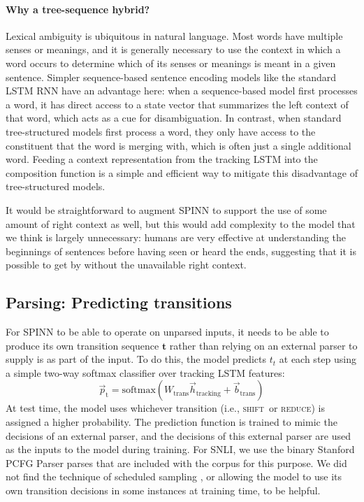 \documentclass[11pt]{article}
\newcommand{\shift}{\textsc{shift}}
\newcommand{\reduce}{\textsc{reduce}}
\begin{document}
\paragraph{Why a tree-sequence hybrid?} 

Lexical ambiguity is ubiquitous in natural language. Most words have multiple senses or meanings, and it is generally necessary to use the context in which a word occurs to determine which of its senses or meanings is meant in a given sentence. Simpler sequence-based sentence encoding models like the standard LSTM RNN have an advantage here: when a sequence-based model first processes a word, it has direct access to a state vector that summarizes the left context of that word, which acts as a cue for disambiguation. In contrast, when standard tree-structured models first process a word, they only have access to the constituent that the word is merging with, which is often just a single additional word. Feeding a context representation from the tracking LSTM into the composition function is a simple and efficient way to mitigate this disadvantage of tree-structured models. 

It would be straightforward to augment SPINN to support the use of some amount of right context as well, but this would add complexity to the model that we think is largely unnecessary: humans are very effective at understanding the beginnings of sentences before having seen or heard the ends, suggesting that it is possible to get by without the unavailable right context.

\subsection{Parsing: Predicting transitions}

For SPINN to be able to operate on unparsed inputs, it needs to be able to produce its own transition sequence $\mathbf t$ rather than relying on an external parser to supply is as part of the input. To do this, the model predicts $t_t$ at each step using a simple two-way softmax classifier over tracking LSTM features:
\begin{equation}
\vec{p}_{\text{t}} = \text{softmax}(W_{\text{trans}}\vec{h}_{\text{tracking}} + \vec{b}_{\text{trans}})
\end{equation}
At test time, the model uses whichever transition (i.e., \shift~or \reduce) is assigned a higher probability. The prediction function is trained to mimic the decisions of an external parser, and the decisions of this external parser are used as the inputs to the model during training. For SNLI, we use the binary Stanford PCFG Parser parses that are included with the corpus for this purpose. We did not find the technique of scheduled sampling \citep{bengio2015scheduled}, or allowing the model to use its own transition decisions in some instances at training time, to be helpful.
\end{document}
